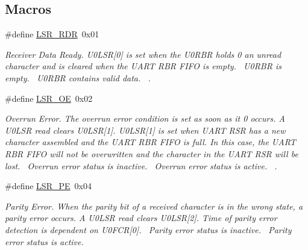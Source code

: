 \subsection*{Macros}
\begin{DoxyCompactItemize}
\item 
\#define \hyperlink{group___r_e_g_i_s_t_r_o___l_s_r_ga9e3adac29ef2f5d2cf60c4cebe971de9}{L\+S\+R\+\_\+\+R\+DR}~0x01
\begin{DoxyCompactList}\small\item\em Receiver Data Ready. U0\+L\+SR\mbox{[}0\mbox{]} is set when the U0\+R\+BR holds 0 an unread character and is cleared when the U\+A\+RT R\+BR F\+I\+FO is empty.~ U0\+R\+BR is empty.~ U0\+R\+BR contains valid data.~\newline
. \end{DoxyCompactList}\item 
\#define \hyperlink{group___r_e_g_i_s_t_r_o___l_s_r_gae844dd49bb0e0770bcf46ad5bfe20973}{L\+S\+R\+\_\+\+OE}~0x02
\begin{DoxyCompactList}\small\item\em Overrun Error. The overrun error condition is set as soon as it 0 occurs. A U0\+L\+SR read clears U0\+L\+SR\mbox{[}1\mbox{]}. U0\+L\+SR\mbox{[}1\mbox{]} is set when U\+A\+RT R\+SR has a new character assembled and the U\+A\+RT R\+BR F\+I\+FO is full. In this case, the U\+A\+RT R\+BR F\+I\+FO will not be overwritten and the character in the U\+A\+RT R\+SR will be lost.~ Overrun error status is inactive.~ Overrun error status is active.~\newline
. \end{DoxyCompactList}\item 
\#define \hyperlink{group___r_e_g_i_s_t_r_o___l_s_r_ga0ee28cdbc0917173f06cc39527452a8f}{L\+S\+R\+\_\+\+PE}~0x04
\begin{DoxyCompactList}\small\item\em Parity Error. When the parity bit of a received character is in the wrong state, a parity error occurs. A U0\+L\+SR read clears U0\+L\+SR\mbox{[}2\mbox{]}. Time of parity error detection is dependent on U0\+F\+CR\mbox{[}0\mbox{]}.~ Parity error status is inactive.~ Parity error status is active.~\newline

\end{DoxyCompactList}
\end{DoxyCompactItemize}

